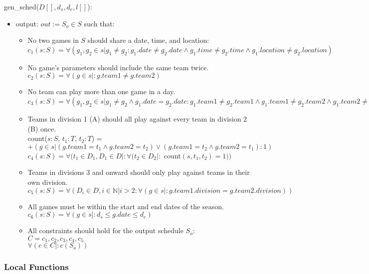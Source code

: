 \documentclass[12pt, titlepage]{article}
\begin{document}
\noindent gen\_sched($D[], d_s, d_e, l[]$):
\begin{itemize}
\item output: $out := S_o \in S$ such that:
\begin{itemize}
  \item No two games in $S$ should share a date, time, and location:\\
  $c_1(s:S) = \forall(g_1, g_2 \in s | g_1 \neq g_2 : g_1.date \neq
  g_2.date \land g_1.time \neq g_2.time \land g_1.location \neq g_2.location)$
  \item No game's parameters should include the same team twice.\\
  $c_2(s:S) = \forall (g \in s |: g.team1 \neq g.team2)$
  \item No team can play more than one game in a day.\\
  $c_3(s:S) = \forall (g_1, g_2 \in s |g_1 \neq g_2 \land g_1.date =
  g_2.date : g_1.team1 \neq g_2.team1 \land g_1.team1 \neq g_2.team2 \land
  g_1.team2 \neq g_2.team1 \land g_1.team2 \neq g_2.team2)$
  \item Teams in division 1 (A) should all play against every team in division
  2 (B) once.\\
  count($s:S$, $t_1:T$, $t_2:T$) = $+(g \in s | (g.team1 = t_1 \land
  g.team2 = t_2) \lor (g.team1 = t_2 \land g.team2 = t_1) : 1)$\\
  $c_4(s:S) = \forall (t_1 \in D_1, D_1 \in D |: \forall (t_2 \in D_2 |:$ count$(s, t_1,
  t_2) = 1))$
  \item Teams in divisions 3 and onward should only play against teams in
  their own division.\\
  $c_5(s:S) = \forall (D_i \in D, i \in \mathbb{N} | i > 2 : \forall (g \in s |:
  g.team1.division = g.team2.division))$
  \item All games must be within the start and end dates of the season.\\
  $c_6(s:S) = \forall (g \in s |: d_s \leq g.date \leq d_e)$
  \item All constraints should hold for the output schedule $S_o$:\\
  $C = {c_1, c_2, c_3, c_4, c_5}$\\
  $\forall(c \in C |: c(S_o))$
\end{itemize}
\end{itemize}

\subsubsection{Local Functions}
\end{document}
